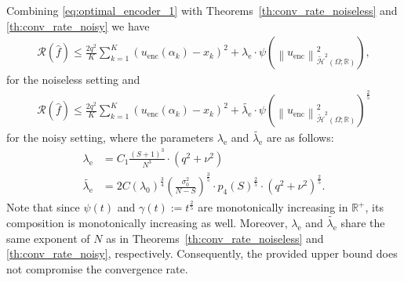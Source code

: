 \documentclass{article}
\def\encs{u_\textrm{enc}}
\def\enclamb{\lambda_\textrm{e}}
\newcommand{\norm}[1]{\left\lVert#1\right\rVert}
\newcommand{\hiltilde}[1]{\widetilde{\mathcal{H}}^{#1}\left(\Omega;\mathbb{R}\right)}
\begin{document}
Combining \eqref{eq:optimal_encoder_1} with Theorems~\ref{th:conv_rate_noiseless} and \ref{th:conv_rate_noisy} we have
\begin{align}\label{eq:encoder_rep_noiseless}
    \mathcal{R}(\hat{f}) \leqslant \frac{2q^2}{K} \sum^K_{k=1} (\encs(\alpha_k) - x_k)^2 + \enclamb \cdot \psi\left(\norm{\encs}^2_{\hiltilde{2}}\right),
\end{align}
for the noiseless setting and
\begin{align}\label{eq:encoder_rep_noisy}
    \mathcal{R}(\hat{f}) \leqslant \frac{2q^2}{K} \sum^K_{k=1} (\encs(\alpha_k) - x_k)^2 + \widetilde{\enclamb} \cdot \psi\left(\norm{\encs}^2_{\hiltilde{2}}\right)^{\frac{2}{5}}
\end{align}
for the noisy setting, where the parameters $\enclamb$ and $\widetilde{\enclamb}$ are as follows:
\begin{align}\label{eq:optim_lambda_rate}
    \enclamb &= C_1\frac{(S+1)^3}{N^3}\cdot (q^2+\nu^2)
    \\
    \widetilde{\enclamb} &= 2C(\lambda_0)^\frac{3}{4} \left(\frac{\sigma^2_0}{N-S}\right)^{\frac{3}{5}} \cdot p_4(S)^{\frac{2}{5}} \cdot (q^2+\nu^2)^{\frac{2}{5}}.
\end{align}
Note that since $\psi(t)$ and $\gamma(t) := t^\frac{2}{5}$ are monotonically increasing in $\mathbb{R}^+$, its composition is monotonically increasing as well. Moreover, $\enclamb$ and $\widetilde{\enclamb}$  share the same exponent of $N$ as in Theorems~\ref{th:conv_rate_noiseless} and \ref{th:conv_rate_noisy}, respectively. Consequently, the provided upper bound does not compromise the convergence rate.
\end{document}

